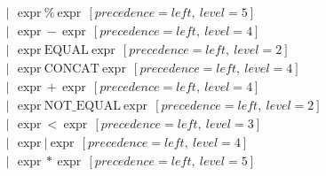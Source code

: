 \documentclass{article}
\begin{document}
\begin{align*}
                                      & |\ \ \ \text{expr}\ \%\ \text{expr}\ \ [precedence=left,\ level=5]                                                                                                                                                        \\
                                      & |\ \ \ \text{expr}\ -\ \text{expr}\ \ [precedence=left,\ level=4]                                                                                                                                                         \\
                                      & |\ \ \ \text{expr}\ \text{EQUAL}\ \text{expr}\ \ [precedence=left,\ level=2]                                                                                                                                              \\
                                      & |\ \ \ \text{expr}\ \text{CONCAT}\ \text{expr}\ \ [precedence=left,\ level=4]                                                                                                                                             \\
                                      & |\ \ \ \text{expr}\ +\ \text{expr}\ \ [precedence=left,\ level=4]                                                                                                                                                         \\
                                      & |\ \ \ \text{expr}\ \text{NOT\_EQUAL}\ \text{expr}\ \ [precedence=left,\ level=2]                                                                                                                                         \\
                                      & |\ \ \ \text{expr}\ <\ \text{expr}\ \ [precedence=left,\ level=3]                                                                                                                                                         \\
                                      & |\ \ \ \text{expr}\ |\ \text{expr}\ \ [precedence=left,\ level=4]                                                                                                                                                         \\
                                      & |\ \ \ \text{expr}\ *\ \text{expr}\ \ [precedence=left,\ level=5]                                                                                                                                                         \\

\end{align*}
\end{document}
